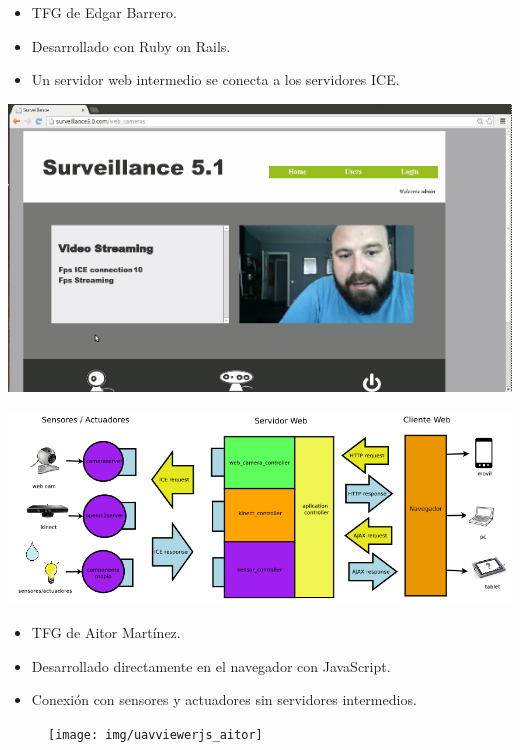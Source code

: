 \documentclass[notes,slidesec,a4]{seminar}
\begin{document}


\begin{hslide}
\begin{itemize}
\item TFG de Edgar Barrero.
\item Desarrollado con Ruby on Rails.
\item Un servidor web intermedio se conecta a los servidores ICE.
\end{itemize}
\begin{minipage}[t]{0.3\textwidth}
\includegraphics[width=\textwidth]{img/surveillance5}
\end{minipage}
\begin{minipage}[t]{0.7\textwidth}
\includegraphics[width=\textwidth]{img/esquema_s5}
\end{minipage}
\end{hslide}




\begin{hslide}
\begin{itemize}
\item TFG de Aitor Martínez.
\item Desarrollado directamente en el navegador con JavaScript.
\item Conexión con sensores y actuadores sin servidores intermedios.
\end{itemize}
\begin{center}
\begin{figure}
\texttt{[image: img/uavviewerjs\_aitor]}
\end{figure}
\end{center}
\end{hslide}
\end{document}
